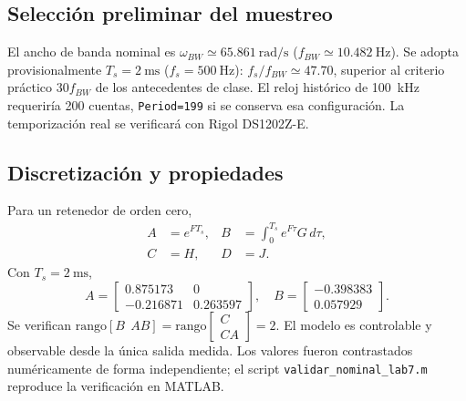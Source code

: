 \subsection{Selección preliminar del muestreo}
El ancho de banda nominal es
$\omega_{BW}\simeq\SI{65.861}{\radian\per\second}$
($f_{BW}\simeq\SI{10.482}{\hertz}$). Se adopta provisionalmente
$T_s=\SI{2}{\milli\second}$ ($f_s=\SI{500}{\hertz}$):
$f_s/f_{BW}\simeq47.70$, superior al criterio práctico $30f_{BW}$
de los antecedentes de clase. El reloj histórico de \SI{100}{\kilo\hertz}
requeriría 200 cuentas, \texttt{Period=199} si se conserva esa
configuración. La temporización real se verificará con Rigol DS1202Z-E.

\subsection{Discretización y propiedades}
Para un retenedor de orden cero,
\begin{align}
A&=e^{FT_s}, & B&=\int_0^{T_s}e^{F\tau}G\,d\tau,\\
C&=H, &D&=J.
\end{align}
Con $T_s=\SI{2}{\milli\second}$,
\begin{equation}
A=\begin{bmatrix}0.875173&0\\-0.216871&0.263597\end{bmatrix},
\quad B=\begin{bmatrix}-0.398383\\0.057929\end{bmatrix}.
\end{equation}
Se verifican
$\mathrm{rango}[B\ \ AB]=\mathrm{rango}
\begin{bmatrix}C\\CA\end{bmatrix}=2$. El modelo es controlable
y observable desde la única salida medida. Los valores fueron
contrastados numéricamente de forma independiente; el script
\texttt{validar\_nominal\_lab7.m} reproduce la verificación en MATLAB.
